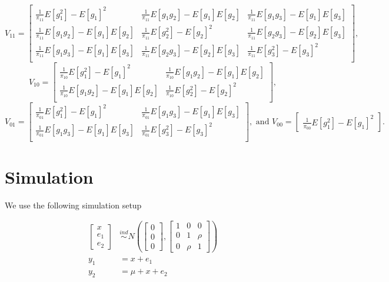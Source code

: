 \documentclass[
  letterpaper,
  DIV=11,
  numbers=noendperiod]{scrartcl}
\begin{document}
\[
V_{11} = 
\begin{bmatrix}
\frac{1}{\pi_{11}} E[g_1^2] - E[g_1]^2 & \frac{1}{\pi_{11}} E[g_1g_2] -
E[g_1]E[g_2] & \frac{1}{\pi_{11}} E[g_1g_3] - E[g_1]E[g_3] \\
\frac{1}{\pi_{11}} E[g_1g_2] - E[g_1]E[g_2] & \frac{1}{\pi_{11}} E[g_2^2] -
E[g_2]^2 & \frac{1}{\pi_{11}} E[g_2g_3] - E[g_2]E[g_3] \\
\frac{1}{\pi_{11}} E[g_1g_3] - E[g_1]E[g_3] & \frac{1}{\pi_{11}} E[g_2g_3] -
E[g_2]E[g_3] & \frac{1}{\pi_{11}} E[g_3^2] - E[g_3]^2 \\
\end{bmatrix},
\] \[
V_{10} = 
\begin{bmatrix}
\frac{1}{\pi_{10}}E[g_1^2] - E[g_1]^2 & \frac{1}{\pi_{10}}E[g_1g_2] - E[g_1]E[g_2]\\
\frac{1}{\pi_{10}}E[g_1g_2] - E[g_1]E[g_2] & \frac{1}{\pi_{10}}E[g_2^2] - E[g_2]^2 \\
\end{bmatrix},
\] \[
V_{01} = 
\begin{bmatrix}
\frac{1}{\pi_{01}}E[g_1^2] - E[g_1]^2 & \frac{1}{\pi_{01}}E[g_1g_3] - E[g_1]E[g_3]\\
\frac{1}{\pi_{01}}E[g_1g_3] - E[g_1]E[g_3] & \frac{1}{\pi_{01}}E[g_3^2] - E[g_3]^2 \\
\end{bmatrix}, \text{ and }
V_{00} = 
\begin{bmatrix}
\frac{1}{\pi_{00}}E[g_1^2] - E[g_1]^2
\end{bmatrix}.
\]

\newpage{}

\hypertarget{simulation}{%
\section{Simulation}\label{simulation}}

We use the following simulation setup

\begin{align*}
  \begin{bmatrix} x \\ e_1 \\ e_2 \end{bmatrix} 
  &\stackrel{ind}{\sim} N\left(\begin{bmatrix} 0 \\ 0 \\ 0 \end{bmatrix}, 
  \begin{bmatrix} 1 & 0 & 0 \\ 0 & 1 & \rho \\ 0 & \rho & 1 \end{bmatrix}\right) \\
  y_1 &= x + e_1 \\
  y_2 &= \mu + x + e_2 \\
\end{align*}
\end{document}

